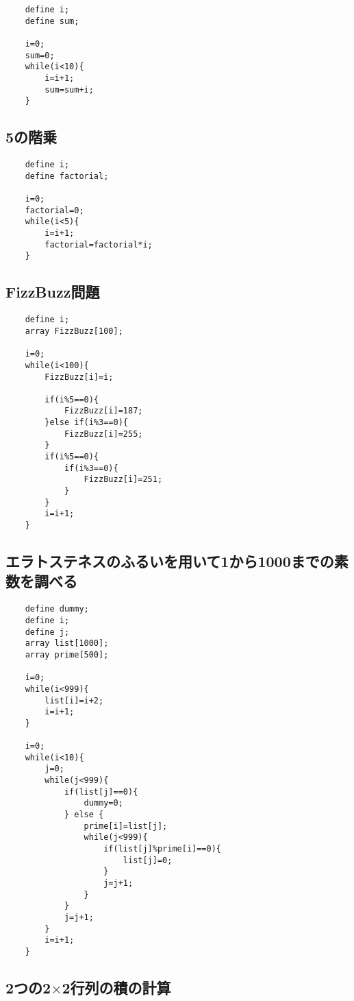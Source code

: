 \documentclass[11pt]{jarticle}
\begin{document}
\begin{lstlisting}
    define i;
    define sum;

    i=0;
    sum=0;
    while(i<10){
        i=i+1;
        sum=sum+i;
    }
\end{lstlisting}

\subsection{5の階乗}

\begin{lstlisting}
    define i;
    define factorial;

    i=0;
    factorial=0;
    while(i<5){
        i=i+1;
        factorial=factorial*i;
    }
\end{lstlisting}

\subsection{FizzBuzz問題}

\begin{lstlisting}
    define i;
    array FizzBuzz[100];

    i=0;
    while(i<100){
        FizzBuzz[i]=i;

        if(i%5==0){
            FizzBuzz[i]=187;
        }else if(i%3==0){
            FizzBuzz[i]=255;
        }
        if(i%5==0){
            if(i%3==0){
                FizzBuzz[i]=251;
            }
        }
        i=i+1;
    }
\end{lstlisting}

\subsection{エラトステネスのふるいを用いて1から1000までの素数を調べる}

\begin{lstlisting}
    define dummy;
    define i;
    define j;
    array list[1000];
    array prime[500];
    
    i=0;
    while(i<999){
        list[i]=i+2;
        i=i+1;
    }

    i=0;
    while(i<10){
        j=0;
        while(j<999){
            if(list[j]==0){
                dummy=0;
            } else {
                prime[i]=list[j];
                while(j<999){
                    if(list[j]%prime[i]==0){
                        list[j]=0;
                    }
                    j=j+1;
                }
            }
            j=j+1;
        }
        i=i+1;
    }
\end{lstlisting}

\subsection{2つの2$\times$2行列の積の計算}
\end{document}
